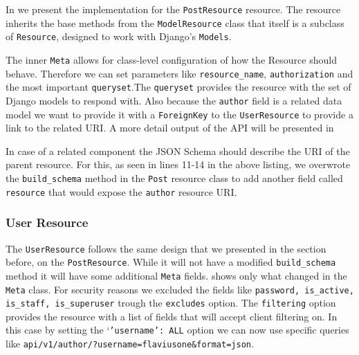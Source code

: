 In  we present the implementation for the \texttt{PostResource} resource. The resource inherits the base methods from the \texttt{ModelResource} class that itself is a subclass of \texttt{Resource}, designed to work with Django’s \texttt{Models}. 

	

The inner \texttt{Meta} allows for class-level configuration of how the Resource should behave. Therefore we can set parameters like \texttt{resource\_name}, \texttt{authorization} and the most important \texttt{queryset}.The \texttt{queryset} provides the resource with the set of Django models to respond with. Also because the \texttt{author} field is a related data model we want to provide it with a \texttt{ForeignKey} to the \texttt{UserResource} to provide a link to the related URI. A more detail output of the API will be presented in

In case of a related component the JSON Schema should describe the URI of the parent resource. For this, as seen in lines 11-14 in the above listing,  we overwrote the \texttt{build\_schema} method in the \texttt{Post} resource class to add another field called \texttt{resource} that would expose the \texttt{author} resource URI.


\subsubsection{User Resource}
\label{sub-sub-sec:user-resource}

The \texttt{UserResource} follows the same design that we presented in the section before, on the \texttt{PostResource}. While it will not have a modified \texttt{build\_schema} method it will have some additional \texttt{Meta} fields.  shows only what changed in the \texttt{Meta} class. For security reasons we excluded the fields like \texttt{password, is\_active, is\_staff, is\_superuser} trough the \texttt{excludes} option. The \texttt{filtering} option provides the resource with a list of fields that will accept client filtering on. In this case by setting the `\texttt{'username': ALL} option we can now use specific queries like \texttt{api/v1/author/?username=flaviusone\&format=json}.



